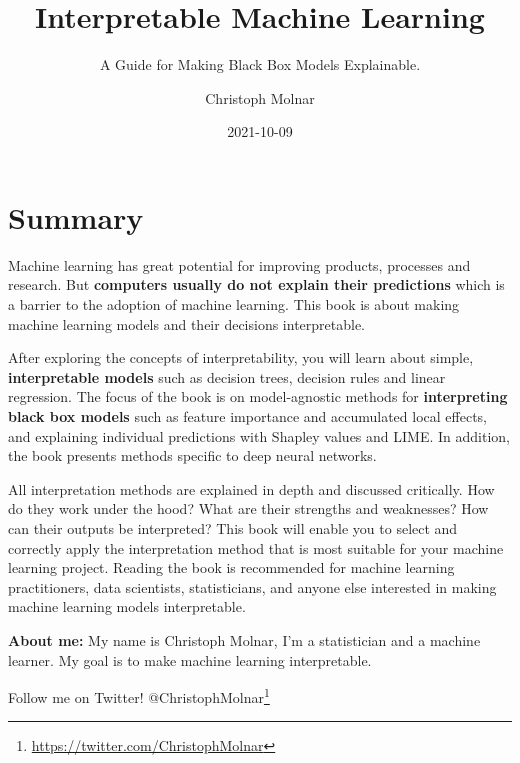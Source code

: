 \documentclass[
  12pt,
]{krantz}
\title{Interpretable Machine Learning}
\subtitle{A Guide for Making Black Box Models Explainable.}
\author{Christoph Molnar}
\date{2021-10-09}
\renewcommand{\href}[2]{#2\footnote{\url{#1}}}
\begin{document}
\maketitle

\thispagestyle{empty}

\setlength{\abovedisplayskip}{-5pt}
\setlength{\abovedisplayshortskip}{-5pt}

{
\hypersetup{linkcolor=}
\setcounter{tocdepth}{1}
\tableofcontents
}
\listoftables
\listoffigures
\hypertarget{summary}{%
\chapter*{Summary}\label{summary}}


Machine learning has great potential for improving products, processes and research.
But \textbf{computers usually do not explain their predictions} which is a barrier to the adoption of machine learning.
This book is about making machine learning models and their decisions interpretable.

After exploring the concepts of interpretability, you will learn about simple, \textbf{interpretable models} such as decision trees, decision rules and linear regression.
The focus of the book is on model-agnostic methods for \textbf{interpreting black box models} such as feature importance and accumulated local effects, and explaining individual predictions with Shapley values and LIME.
In addition, the book presents methods specific to deep neural networks.

All interpretation methods are explained in depth and discussed critically.
How do they work under the hood?
What are their strengths and weaknesses?
How can their outputs be interpreted?
This book will enable you to select and correctly apply the interpretation method that is most suitable for your machine learning project.
Reading the book is recommended for machine learning practitioners, data scientists, statisticians, and anyone else interested in making machine learning models interpretable.

\textbf{About me:} My name is Christoph Molnar, I'm a statistician and a machine learner.
My goal is to make machine learning interpretable.

Follow me on Twitter! \href{https://twitter.com/ChristophMolnar}{@ChristophMolnar}
\end{document}
